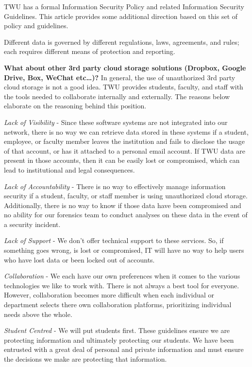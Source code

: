 \documentclass[
]{book}
\theoremstyle{definition}
\theoremstyle{definition}
\theoremstyle{definition}
\theoremstyle{definition}
\theoremstyle{remark}
\begin{document}
TWU has a formal Information Security Policy and related Information Security Guidelines. This article provides some additional direction based on this set of policy and guidelines.

Different data is governed by different regulations, laws, agreements, and rules; each requires different means of protection and reporting.

\textbf{What about other 3rd party cloud storage solutions (Dropbox, Google Drive, Box, WeChat etc\ldots)?} In general, the use of unauthorized 3rd party cloud storage is not a good idea. TWU provides students, faculty, and staff with the tools needed to collaborate internally and externally. The reasons below elaborate on the reasoning behind this position.

\emph{Lack of Visibility} - Since these software systems are not integrated into our network, there is no way we can retrieve data stored in these systems if a student, employee, or faculty member leaves the institution and fails to disclose the usage of that account, or has it attached to a personal email account. If TWU data are present in those accounts, then it can be easily lost or compromised, which can lead to institutional and legal consequences.

\emph{Lack of Accountability} - There is no way to effectively manage information security if a student, faculty, or staff member is using unauthorized cloud storage. Additionally, there is no way to know if those data have been compromised and no ability for our forensics team to conduct analyses on these data in the event of a security incident.

\emph{Lack of Support} - We don't offer technical support to these services. So, if something goes wrong, is lost or compromised, IT will have no way to help users who have lost data or been locked out of accounts.

\emph{Collaboration} - We each have our own preferences when it comes to the various technologies we like to work with. There is not always a best tool for everyone. However, collaboration becomes more difficult when each individual or department selects there own collaboration platforms, prioritizing individual needs above the whole.

\emph{Student Centred} - We will put students first. These guidelines ensure we are protecting information and ultimately protecting our students. We have been entrusted with a great deal of personal and private information and must ensure the decisions we make are protecting that information.
\end{document}
